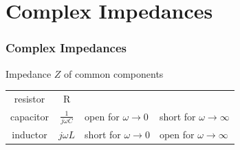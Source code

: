 \documentclass[beamer]{standalone}
\begin{document}
\section{Complex Impedances}
\begin{frame}
 \frametitle{Complex Impedances}
 \begin{block}{Impedance $Z$ of common components}
  \begin{center}
   \begin{tabular}{c|c|l|l}
    resistor & R & \\
    capacitor & $\frac{1}{j\omega C}$ & open for $\omega \to 0$ & short for $\omega \to \infty$ \\
    inductor & $j\omega L$ & short for $\omega \to 0$ & open for $\omega \to \infty$ \\
   \end{tabular}
  \end{center}
 \end{block}
\end{frame}
\end{document}
